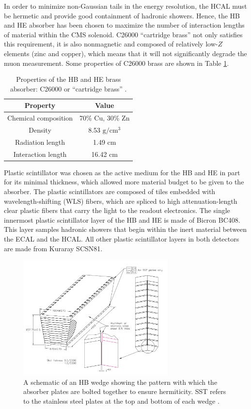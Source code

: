 In order to minimize non-Gaussian tails in the energy resolution,
the HCAL must be hermetic and provide good containment of hadronic 
showers. Hence, the HB and HE absorber has been chosen to maximize the number 
of interaction lengths of material within the CMS solenoid.
C26000 ``cartridge brass'' not only satisfies this requirement, it is also nonmagnetic
and composed of relatively low-$Z$ elements (zinc and copper), which
means that it will not significantly degrade the muon measurement.
Some properties of C26000 brass are shown in Table \ref{tab:hcal-brass}.

\begin{table}
  \centering
  \begin{tabular}{c|c}
    Property & Value \\
    \hline\hline
    Chemical composition & 70\% Cu, 30\% Zn \\
    Density & 8.53 $\text{g}/\text{cm}^{3}$ \\
    Radiation length & 1.49 cm \\
    Interaction length & 16.42 cm \\
  \end{tabular}
  \caption{Properties of the HB and HE brass absorber: C26000 or ``cartridge brass'' \cite{cms-jinst}.}
  \label{tab:hcal-brass}
\end{table}

Plastic scintillator was chosen as the active medium for the HB and HE 
in part for its minimal thickness, which allowed more material 
budget to be given to the absorber.  
The plastic scintillators are
composed of tiles embedded with wavelength-shifting (WLS)
fibers, which are spliced to high attenuation-length clear
plastic fibers that carry the light to the readout electronics.
The single innermost plastic scintillator layer of the HB and HE 
is made of Bicron BC408.  This layer samples hadronic showers 
that begin within the inert material between the ECAL and the HCAL.
All other plastic scintillator layers in both
detectors are made from Kuraray SCSN81.

\begin{figure}
  \centering
  \includegraphics[width=0.7\textwidth]{tex/cms/fig/hcal-wedge.png}
  \caption{A schematic of an HB wedge showing the pattern with which the 
    absorber plates are bolted together to ensure hermiticity.  SST refers
    to the stainless steel plates at the top and bottom of each wedge \cite{cms-jinst}.}
  \label{fig:hcal-wedge}
\end{figure}


